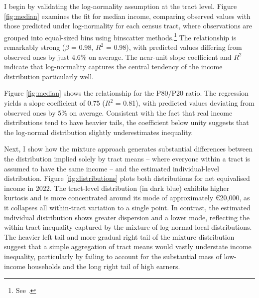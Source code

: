 
I begin by validating the log-normality assumption at the tract level. Figure \ref{fig:median} examines the fit for median income, comparing observed values with those predicted under log-normality for each census tract, where observations are grouped into equal-sized bins using binscatter methods.\footnote{See \cite{cattaneo}.} The relationship is remarkably strong ($\beta$ = 0.98, $R^2$ = 0.98), with predicted values differing from observed ones by just 4.6\% on average. The near-unit slope coefficient and $R^2$ indicate that log-normality captures the central tendency of the income distribution particularly well.

Figure \ref{fig:median} shows the relationship for the P80/P20 ratio. The regression yields a slope coefficient of 0.75 ($R^2$ = 0.81), with predicted values deviating from observed ones by 5\% on average. Consistent with the fact that real income distributions tend to have heavier tails, the coefficient below unity suggests that the log-normal distribution slightly underestimates inequality.

Next, I show how the mixture approach generates substantial differences between the distribution implied solely by tract means -- where everyone within a tract is assumed to have the same income -- and the estimated individual-level distribution. Figure \ref{fig:distributions} plots both distributions for net equivalised income in 2022. The tract-level distribution (in dark blue) exhibits higher kurtosis and is more concentrated around its mode of approximately €20,000, as it collapses all within-tract variation to a single point. In contrast, the estimated individual distribution shows greater dispersion and a lower mode, reflecting the within-tract inequality captured by the mixture of log-normal local distributions. The heavier left tail and more gradual right tail of the mixture distribution suggest that a simple aggregation of tract means would vastly understate income inequality, particularly by failing to account for the substantial mass of low-income households and the long right tail of high earners.

